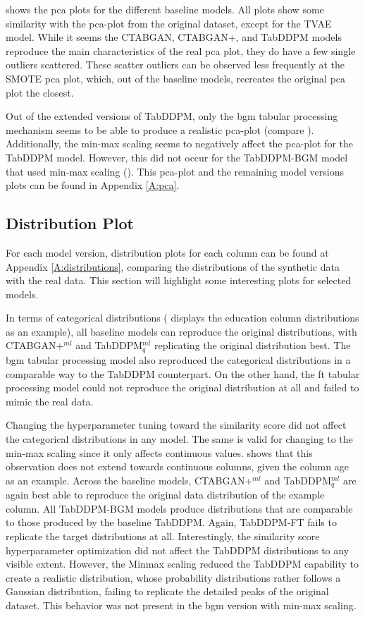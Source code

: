  shows the \gls{pca} plots for the different baseline models. 
All plots show some similarity with the \gls{pca}-plot from the original dataset, except for the TVAE model. 
While it seems the CTABGAN, CTABGAN+, and TabDDPM models reproduce the main characteristics of the real \gls{pca} plot, they do have a few single outliers scattered.
These scatter outliers can be observed less frequently at the SMOTE \gls{pca} plot, which, out of the baseline models, recreates the original \gls{pca} plot the closest.


Out of the extended versions of TabDDPM, only the \gls{bgm} tabular processing mechanism seems to be able to produce a realistic \gls{pca}-plot (compare ).
Additionally, the min-max scaling seems to negatively affect the \gls{pca}-plot for the TabDDPM model.
However, this did not occur for the TabDDPM-BGM model that used min-max scaling ().
This \gls{pca}-plot and the remaining model versions plots can be found in Appendix \ref{A:pca}.

\subsection{Distribution Plot}
\label{ch:results-Distr}


For each model version, distribution plots for each column can be found at Appendix \ref{A:distributions}, comparing the distributions of the synthetic data with the real data.
This section will highlight some interesting plots for selected models.

In terms of categorical distributions ( displays the education column distributions as an example), all baseline models can reproduce the original distributions,
with CTABGAN+$^{ml}$ and TabDDPM$^{ml}_q$ replicating the original distribution best.
The \gls{bgm} tabular processing model also reproduced the categorical distributions in a comparable way to the TabDDPM counterpart.
On the other hand, the \gls{ft} tabular processing model could not reproduce the original distribution at all and failed to mimic the real data.

Changing the hyperparameter tuning toward the similarity score did not affect the categorical distributions in any model.
The same is valid for changing to the min-max scaling since it only affects continuous values.
 shows that this observation does not extend towards continuous columns, given the column age as an example.
Across the baseline models, CTABGAN+$^{ml}$ and TabDDPM$^{ml}_q$ are again best able to reproduce the original data distribution of the example column.
All TabDDPM-BGM models produce distributions that are comparable to those produced by the baseline TabDDPM.
Again, TabDDPM-FT fails to replicate the target distributions at all.
Interestingly, the similarity score hyperparameter optimization did not affect the TabDDPM distributions to any visible extent.
However, the Minmax scaling reduced the TabDDPM capability to create a realistic distribution, whose probability distributions rather follows a Gaussian distribution, failing to replicate the detailed peaks of the original dataset.
This behavior was not present in the \gls{bgm} version with min-max scaling.

